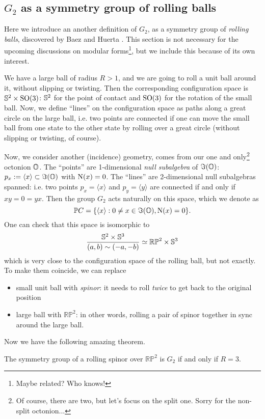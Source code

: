\subsection{$G_2$ as a symmetry group of rolling balls}

Here we introduce an another definition of $G_2$, as a symmetry group of \emph{rolling balls}, discovered by Baez and Huerta \cite{baez2014g2}.
This section is not necessary for the upcoming discussions on modular forms\footnote{Maybe related? Who knows!}, but we include this because of its own interest.

We have a large ball of radius $R > 1$, and we are going to roll a unit ball around it, without slipping or twisting.
Then the corresponding configuration space is $\mathbb{S}^2 \times \mathrm{SO}(3)$: $\mathbb{S}^2$ for the point of contact and $\mathrm{SO}(3)$ for the rotation of the small ball.
Now, we define ``lines'' on the configuration space as paths along a great circle on the large ball, i.e. two points are connected if one can move the small ball from one state to the other state by rolling over a great circle (without slipping or twisting, of course).

Now, we consider another (incidence) geometry, comes from our one and only\footnote{Of course, there are two, but let's focus on the split one. Sorry for the non-split octonion...} octonion $\mathbb{O}$.
The ``points'' are 1-dimensional \emph{null subalgebra} of $\Im(\mathbb{O})$: $p_x := \langle x \rangle \subset \Im(\mathbb{O})$ with $\mathrm{N}(x) = 0$.
The ``lines'' are 2-dimensional null subalgebras spanned: i.e. two points $p_x = \langle x \rangle$ and $p_y = \langle y \rangle$ are connected if and only if $xy = 0 = yx$.
Then the group $G_2$ acts naturally on this space, which we denote as
$$
\mathbb{P}C = \{\langle x \rangle: 0 \ne x \in \Im(\mathbb{O}), \mathrm{N}(x) = 0\}.
$$
One can check that this space is isomorphic to
$$
\frac{\mathbb{S}^2 \times \mathbb{S}^3}{(a, b) \sim (-a, -b)} \simeq \mathbb{RP}^{2} \times \mathbb{S}^3
$$
which is very close to the configuration space of the rolling ball, but not exactly.
To make them coincide, we can replace
\begin{itemize}
    \item small unit ball with \emph{spinor}: it needs to roll \emph{twice} to get back to the original position
    \item large ball with $\mathbb{RP}^{2}$: in other words, rolling a pair of spinor together in sync around the large ball.
\end{itemize}
Now we have the following amazing theorem.
\begin{theorem}
    The symmetry group of a rolling spinor over $\mathbb{RP}^2$ is $G_2$ if and only if $R = 3$.
\end{theorem}
